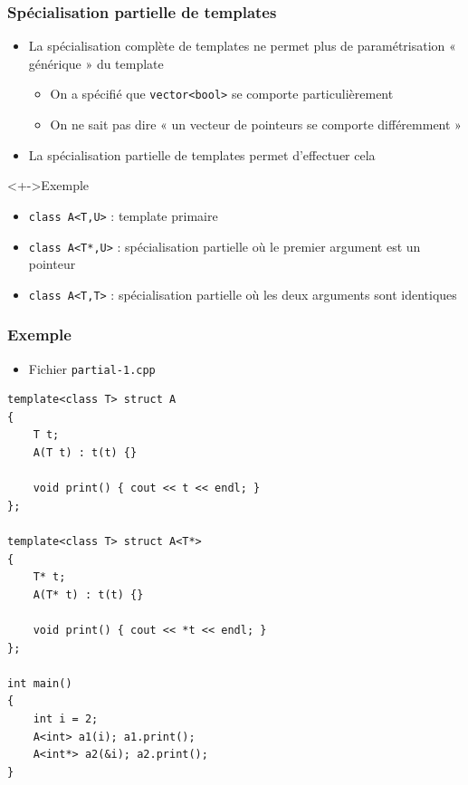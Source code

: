 \begin{frame}
\frametitle{Spécialisation partielle de templates}
\begin{itemize}[<+->]
\item La spécialisation complète de templates ne permet plus de paramétrisation « générique » du template
	\begin{itemize}
	\item On a spécifié que \lstinline|vector<bool>| se comporte particulièrement
	\item On ne sait pas dire « un vecteur de pointeurs se comporte différemment »
	\end{itemize}
\item La spécialisation partielle de templates permet d'effectuer cela
\end{itemize}
\begin{exampleblock}<+->{Exemple}
	\begin{itemize}[<+->]
	\item \lstinline|class A<T,U>| : template primaire
	\item \lstinline|class A<T*,U>| : spécialisation partielle où le premier argument est un pointeur
	\item \lstinline|class A<T,T>| : spécialisation partielle où les deux arguments sont identiques
	\end{itemize}
\end{exampleblock}
\end{frame}

\begin{frame}[containsverbatim]
\frametitle{Exemple}
\begin{itemize}
\item Fichier \texttt{partial-1.cpp}
\end{itemize}
\begin{lstlisting}
template<class T> struct A
{	
	T t;
	A(T t) : t(t) {}
	
	void print() { cout << t << endl; }
};

template<class T> struct A<T*>
{
	T* t;
	A(T* t) : t(t) {}
	
	void print() { cout << *t << endl; }
};

int main()
{
	int i = 2;
	A<int> a1(i); a1.print();
	A<int*> a2(&i); a2.print();
}
\end{lstlisting}
\end{frame}

